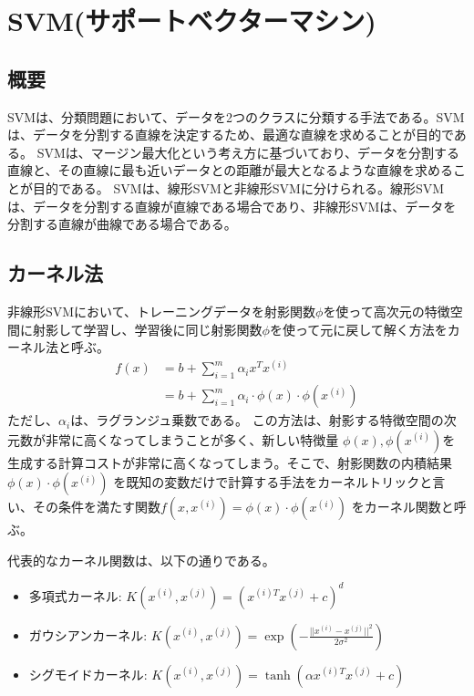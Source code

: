 \documentclass{ltjsarticle}
\begin{document}
\section{SVM(サポートベクターマシン)}
\subsection{概要}
SVMは、分類問題において、データを2つのクラスに分類する手法である。SVMは、データを分割する直線を決定するため、最適な直線を求めることが目的である。
SVMは、マージン最大化という考え方に基づいており、データを分割する直線と、その直線に最も近いデータとの距離が最大となるような直線を求めることが目的である。
SVMは、線形SVMと非線形SVMに分けられる。線形SVMは、データを分割する直線が直線である場合であり、非線形SVMは、データを分割する直線が曲線である場合である。

\subsection{カーネル法}
非線形SVMにおいて、トレーニングデータを射影関数$\phi$を使って高次元の特徴空間に射影して学習し、学習後に同じ射影関数$\phi$を使って元に戻して解く方法をカーネル法と呼ぶ。
\begin{align}
  f(x) &= b + \sum_{i=1}^{m} \alpha_i x^T x^{(i)} \\
&= b + \sum_{i=1}^{m} \alpha_i \cdot \phi(x) \cdot \phi(x^{(i)})
\end{align}
ただし、$\alpha_i$は、ラグランジュ乗数である。
この方法は、射影する特徴空間の次元数が非常に高くなってしまうことが多く、新しい特徴量 $\phi(x), \phi(x^{(i)})$を生成する計算コストが非常に高くなってしまう。そこで、射影関数の内積結果$\phi(x) \cdot \phi(x^{(i)})$ を既知の変数だけで計算する手法をカーネルトリックと言い、その条件を満たす関数$f(x,x^{(i)}) = \phi(x) \cdot \phi(x^{(i)})$
をカーネル関数と呼ぶ。

代表的なカーネル関数は、以下の通りである。
\begin{itemize}
  \item 多項式カーネル: $K(x^{(i)}, x^{(j)}) = (x^{(i)T} x^{(j)} + c)^d$
  \item ガウシアンカーネル: $K(x^{(i)}, x^{(j)}) = \exp(-\frac{||x^{(i)} - x^{(j)}||^2}{2\sigma^2})$
  \item シグモイドカーネル: $K(x^{(i)}, x^{(j)}) = \tanh(\alpha x^{(i)T} x^{(j)} + c)$
\end{itemize}
\end{document}
